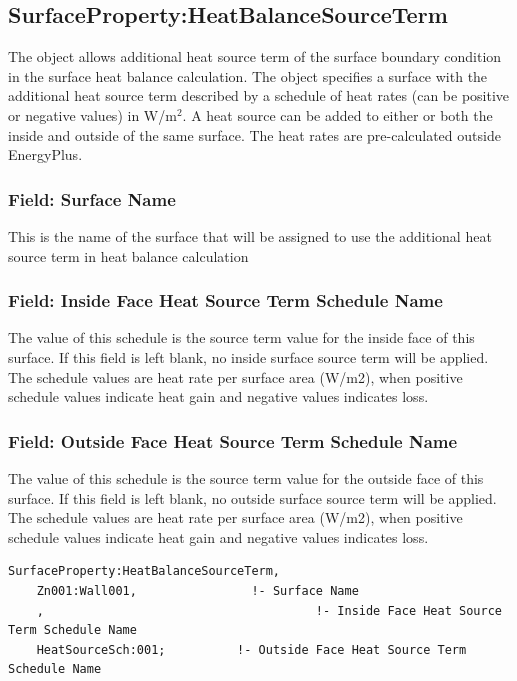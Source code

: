 \subsection{SurfaceProperty:HeatBalanceSourceTerm}\label{surfacePropertyHeatBalanceSourceTerm}

The object allows additional heat source term of the surface boundary condition in the surface heat balance calculation. The object specifies a surface with the additional heat source term described by a schedule of heat rates (can be positive or negative values) in W/m\(^2\). A heat source can be added	to either or both the inside and outside of the same surface. The heat rates are pre-calculated outside EnergyPlus.

\subsubsection{Field: Surface Name}\label{surfacePropertyHeatBalanceSourceTerm-field-surface-name}

This is the name of the surface that will be assigned to use the additional heat source term in heat balance calculation

\subsubsection{Field: Inside Face Heat Source Term Schedule Name}\label{field-inside-heat-source-term-schedule-name}

The value of this schedule is the source term value for the inside face of this surface. If this field is left blank, no inside surface source term will be applied. The schedule values are heat rate per surface area (W/m2), when positive schedule values indicate heat gain and negative values indicates loss.

\subsubsection{Field: Outside Face Heat Source Term Schedule Name}\label{field-outside-heat-source-term-schedule-name}

The value of this schedule is the source term value for the outside face of this surface. If this field is left blank, no outside surface source term will be applied. The schedule values are heat rate per surface area (W/m2), when positive schedule values indicate heat gain and negative values indicates loss.

\begin{lstlisting}
SurfaceProperty:HeatBalanceSourceTerm,
    Zn001:Wall001,                !- Surface Name
    ,                                      !- Inside Face Heat Source Term Schedule Name
    HeatSourceSch:001;          !- Outside Face Heat Source Term Schedule Name
\end{lstlisting}


